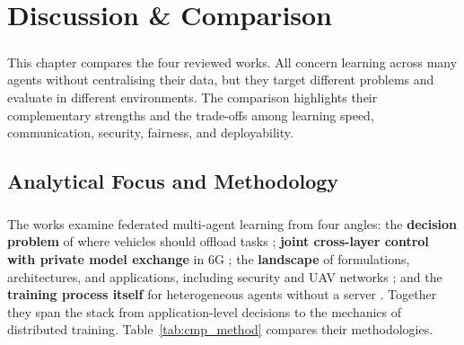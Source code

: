 \documentclass[12pt,a4paper,final]{extreport}
\begin{document}
\chapter{Discussion \& Comparison}

\paragraph{} This chapter compares the four reviewed works. All concern learning across many agents without centralising their data, but they target different problems and evaluate in different environments. The comparison highlights their complementary strengths and the trade-offs among learning speed, communication, security, fairness, and deployability.

\section{Analytical Focus and Methodology}

\paragraph{} The works examine federated multi-agent learning from four angles: the \textbf{decision problem} of where vehicles should offload tasks \cite{p1}; \textbf{joint cross-layer control with private model exchange} in 6G \cite{p2}; the \textbf{landscape} of formulations, architectures, and applications, including security and UAV networks \cite{p3}; and the \textbf{training process itself} for heterogeneous agents without a server \cite{p4}. Together they span the stack from application-level decisions to the mechanics of distributed training. Table~\ref{tab:cmp_method} compares their methodologies.
\end{document}

